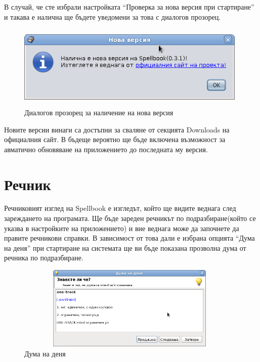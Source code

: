 В случай, че сте избрали настройката "`Проверка за нова версия при
стартиране"' и такава е налична ще бъдете уведомени за това с диалогов
прозорец.

\begin{figure}[htbp]
  \caption{Диалогов прозорец за наличение на нова версия}
  \centering
  \includegraphics[width=110mm, height=40mm]{images/new-version.png}
\end{figure}

Новите версии винаги са достъпни за сваляне от секцията Downloads на
официалния сайт. В бъдеще вероятно ще бъде включена възможност за
авматично обновяване на приложението до последната му версия.
\section{Речник}
Речниковият изглед на Spellbook е изгледът, който ще видите веднага
след зареждането на програмата. Ще бъде зареден речникът по
подразбиране(който се указва в настройките на приложението) и вие
веднага може да започнете да правите речникови справки. В зависимост
от това дали е избрана опцията "`Дума на деня"' при стартиране на
системата ще ви бъде показана прозволна дума от речника по подразбиране.
\begin{figure}[htbp]
  \caption{Дума на деня}
  \centering
  \includegraphics[width=110mm, height=40mm]{images/word_of_the_day.png}
\end{figure}

